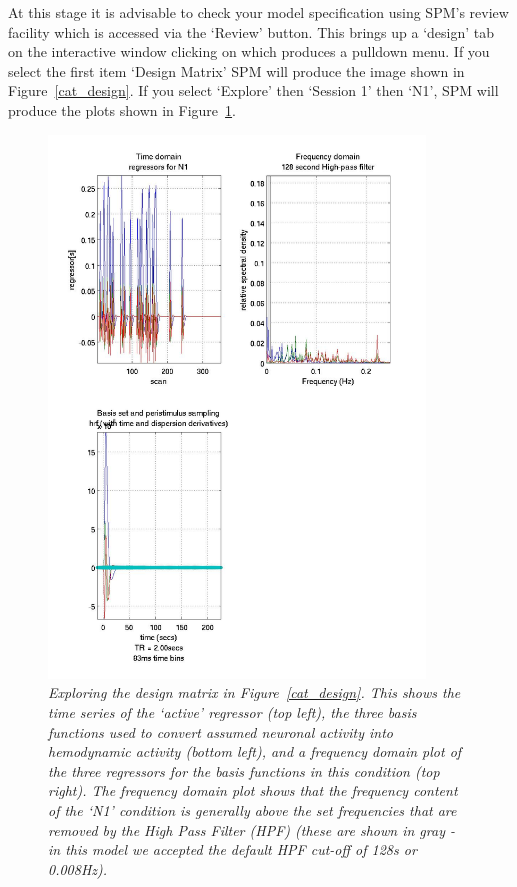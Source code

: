 At this stage it is advisable to check your model specification
using SPM's review facility which is accessed via
the `Review' button. This brings up a `design' tab on the 
interactive window clicking on which produces a pulldown
menu. If you select the first item `Design Matrix' SPM will 
produce the image shown in Figure~\ref{cat_design}. 
If you select `Explore' then `Session 1' then `N1', SPM will produce 
the plots shown in Figure~\ref{cat_explore}.
\begin{figure}
\begin{center}
\includegraphics[width=100mm]{faces/cat_explore}
\caption{\em Exploring the design matrix in Figure~\ref{cat_design}. This shows the time series of 
the `active' regressor (top left), the three basis functions used to convert assumed neuronal activity into hemodynamic activity (bottom left), and a frequency domain plot of the three regressors for the basis functions in this condition (top right). The frequency domain plot shows that the 
frequency content of the `N1' condition is generally above the set frequencies that are removed by the High Pass 
Filter (HPF) (these are shown in gray - in this model we accepted the default HPF cut-off of 128s or 
0.008Hz). \label{cat_explore}}
\end{center}
\end{figure}

